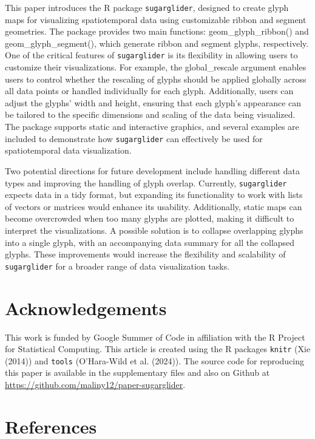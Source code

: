 This paper introduces the R package \texttt{sugarglider}, designed to create glyph maps for visualizing spatiotemporal data using customizable ribbon and segment geometries. The package provides two main functions: geom\_glyph\_ribbon() and geom\_glyph\_segment(), which generate ribbon and segment glyphs, respectively. One of the critical features of \texttt{sugarglider} is its flexibility in allowing users to customize their visualizations. For example, the global\_rescale argument enables users to control whether the rescaling of glyphs should be applied globally across all data points or handled individually for each glyph. Additionally, users can adjust the glyphs' width and height, ensuring that each glyph's appearance can be tailored to the specific dimensions and scaling of the data being visualized. The package supports static and interactive graphics, and several examples are included to demonstrate how \texttt{sugarglider} can effectively be used for spatiotemporal data visualization.

Two potential directions for future development include handling different data types and improving the handling of glyph overlap. Currently, \texttt{sugarglider} expects data in a tidy format, but expanding its functionality to work with lists of vectors or matrices would enhance its usability. Additionally, static maps can become overcrowded when too many glyphs are plotted, making it difficult to interpret the visualizations. A possible solution is to collapse overlapping glyphs into a single glyph, with an accompanying data summary for all the collapsed glyphs. These improvements would increase the flexibility and scalability of \texttt{sugarglider} for a broader range of data visualization tasks.

\hypertarget{acknowledgements}{%
\section{Acknowledgements}\label{acknowledgements}}

This work is funded by Google Summer of Code in affiliation with the R Project for Statistical Computing. This article is created using the R packages \texttt{knitr} (Xie (2014)) and \texttt{tools} (O'Hara-Wild et al. (2024)). The source code for reproducing this paper is available in the supplementary files and also on Github at \url{https://github.com/maliny12/paper-sugarglider}.

\hypertarget{references}{%
\section*{References}\label{references}}

